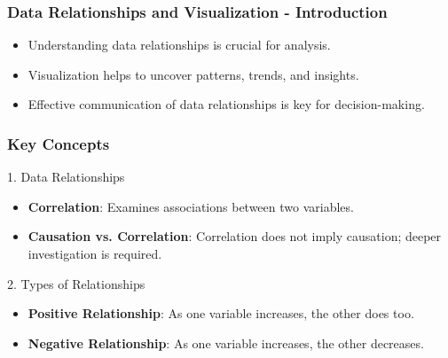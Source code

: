 \documentclass[aspectratio=169]{beamer}
\begin{document}
\begin{frame}[fragile]
    \frametitle{Data Relationships and Visualization - Introduction}
    \begin{itemize}
        \item Understanding data relationships is crucial for analysis.
        \item Visualization helps to uncover patterns, trends, and insights.
        \item Effective communication of data relationships is key for decision-making.
    \end{itemize}
\end{frame}

\begin{frame}[fragile]
    \frametitle{Key Concepts}
    \begin{block}{1. Data Relationships}
        \begin{itemize}
            \item \textbf{Correlation}: Examines associations between two variables.
            \item \textbf{Causation vs. Correlation}: Correlation does not imply causation; deeper investigation is required.
        \end{itemize}
    \end{block}

    \begin{block}{2. Types of Relationships}
        \begin{itemize}
            \item \textbf{Positive Relationship}: As one variable increases, the other does too.
            \item \textbf{Negative Relationship}: As one variable increases, the other decreases.
        \end{itemize}
    \end{block}
\end{frame}
\end{document}
